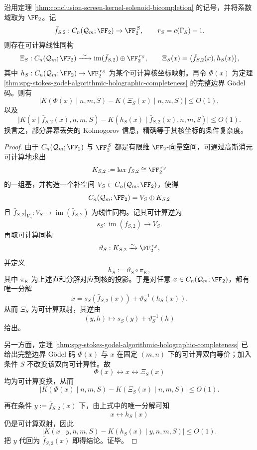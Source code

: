 \begin{theorem}\label{thm:conclusion-screen-kolmogorov-deficit-exact-splitting}
沿用定理 \ref{thm:conclusion-screen-kernel-solenoid-bicompletion} 的记号，并将系数域取为 \(\FF_2\)。记
\[
\bar f_{S,2}:C_n(\mathcal Q_m;\FF_2)\to \FF_2^{\,S},
\qquad
r_S=c(\Gamma_S)-1.
\]
则存在可计算线性同构
\[
\Xi_S:
C_n(\mathcal Q_m;\FF_2)
\xrightarrow{\ \sim\ }
\operatorname{im}(\bar f_{S,2})\oplus \FF_2^{\,r_S},
\qquad
\Xi_S(x)=\bigl(\bar f_{S,2}(x),h_S(x)\bigr),
\]
其中 \(h_S:C_n(\mathcal Q_m;\FF_2)\to \FF_2^{\,r_S}\) 为某个可计算核坐标映射。再令 \(\Phi(x)\) 为定理 \ref{thm:spg-stokes-godel-algorithmic-holographic-completeness} 的完整边界 Gödel 码。则有
\[
\bigl|K(\Phi(x)\mid n,m,S)-K(\Xi_S(x)\mid n,m,S)\bigr|\le O(1),
\]
以及
\[
\bigl|K(x\mid \bar f_{S,2}(x),n,m,S)-K(h_S(x)\mid \bar f_{S,2}(x),n,m,S)\bigr|\le O(1).
\]
换言之，部分屏幕丢失的 Kolmogorov 信息，精确等于其核坐标的条件复杂度。
\end{theorem}

\begin{proof}
由于 \(C_n(\mathcal Q_m;\FF_2)\) 与 \(\FF_2^{\,S}\) 都是有限维 \(\FF_2\)-向量空间，可通过高斯消元可计算地求出
\[
K_{S,2}:=\ker \bar f_{S,2}\cong \FF_2^{\,r_S}
\]
的一组基，并构造一个补空间 \(V_S\subset C_n(\mathcal Q_m;\FF_2)\)，使得
\[
C_n(\mathcal Q_m;\FF_2)=V_S\oplus K_{S,2}
\]
且 \(\bar f_{S,2}|_{V_S}:V_S\to \operatorname{im}(\bar f_{S,2})\) 为线性同构。记其可计算逆为
\[
s_S:\operatorname{im}(\bar f_{S,2})\to V_S.
\]
再取可计算同构
\[
\vartheta_S:K_{S,2}\xrightarrow{\sim}\FF_2^{\,r_S},
\]
并定义
\[
h_S:=\vartheta_S\circ \pi_{K},
\]
其中 \(\pi_K\) 为上述直和分解对应到核的投影。于是对任意 \(x\in C_n(\mathcal Q_m;\FF_2)\)，都有唯一分解
\[
x=s_S(\bar f_{S,2}(x))+\vartheta_S^{-1}(h_S(x)).
\]
从而 \(\Xi_S\) 为可计算双射，其逆由
\[
(y,h)\mapsto s_S(y)+\vartheta_S^{-1}(h)
\]
给出。

另一方面，定理 \ref{thm:spg-stokes-godel-algorithmic-holographic-completeness} 已给出完整边界 Gödel 码 \(\Phi(x)\) 与 \(x\) 在固定 \((m,n)\) 下的可计算双向等价；加入条件 \(S\) 不改变该双向可计算性。故
\[
\Phi(x)\leftrightarrow x\leftrightarrow \Xi_S(x)
\]
均为可计算变换，从而
\[
\bigl|K(\Phi(x)\mid n,m,S)-K(\Xi_S(x)\mid n,m,S)\bigr|\le O(1).
\]

再在条件 \(y:=\bar f_{S,2}(x)\) 下，由上式中的唯一分解可知
\[
x\leftrightarrow h_S(x)
\]
仍是可计算双射，因此
\[
\bigl|K(x\mid y,n,m,S)-K(h_S(x)\mid y,n,m,S)\bigr|\le O(1).
\]
把 \(y\) 代回为 \(\bar f_{S,2}(x)\) 即得结论。证毕。
\end{proof}

